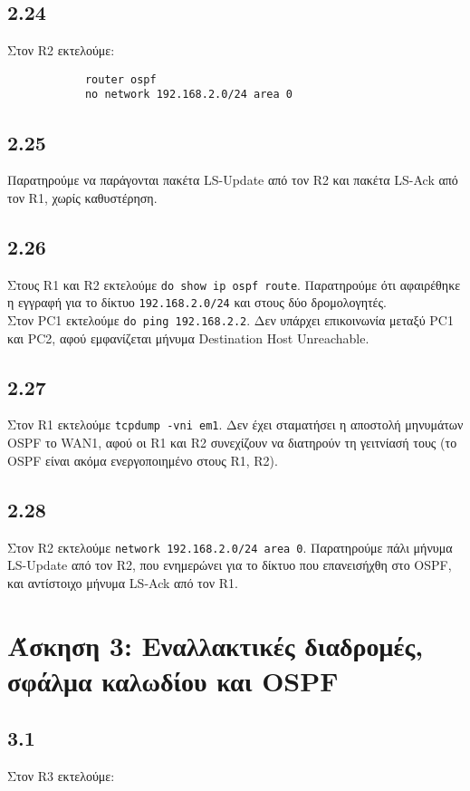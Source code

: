 \documentclass[a4paper, 12pt]{article}
\begin{document}
	\subsection*{2.24}
		Στον R2 εκτελούμε:
		
		\begin{verbatim}
			router ospf
			no network 192.168.2.0/24 area 0
		\end{verbatim}

	\subsection*{2.25}
		Παρατηρούμε να παράγονται πακέτα LS-Update από τον R2 και πακέτα LS-Ack από τον R1, χωρίς καθυστέρηση.

	\subsection*{2.26}
		Στους R1 και R2 εκτελούμε \verb|do show ip ospf route|. Παρατηρούμε ότι αφαιρέθηκε η εγγραφή για το δίκτυο \verb|192.168.2.0/24| και στους δύο δρομολογητές. \\
		
		Στον PC1 εκτελούμε \verb|do ping 192.168.2.2|. Δεν υπάρχει επικοινωνία μεταξύ PC1 και PC2, αφού εμφανίζεται μήνυμα Destination Host Unreachable.

	\subsection*{2.27}
		Στον R1 εκτελούμε \verb|tcpdump -vni em1|. Δεν έχει σταματήσει η αποστολή μηνυμάτων OSPF το WAN1, αφού οι R1 και R2 συνεχίζουν να διατηρούν τη γειτνίασή τους (το OSPF είναι ακόμα ενεργοποιημένο στους R1, R2).

	\subsection*{2.28}
		Στον R2 εκτελούμε \verb|network 192.168.2.0/24 area 0|. Παρατηρούμε πάλι μήνυμα LS-Update από τον R2, που ενημερώνει για το δίκτυο που επανεισήχθη στο OSPF, και αντίστοιχο μήνυμα LS-Ack από τον R1.


\section*{Άσκηση 3: Εναλλακτικές διαδρομές, σφάλμα καλωδίου και OSPF}

	\subsection*{3.1}
		Στον R3 εκτελούμε:
		
\end{document}
